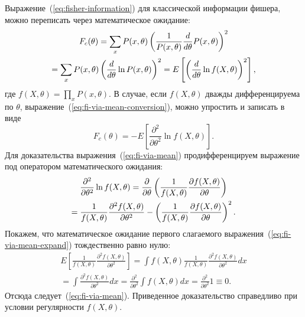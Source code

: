 Выражение~(\ref{eq:fisher-information}) для классической информации фишера, можно переписать через математическое ожидание:
\begin{multline}\label{eq:fi-via-mean-conversion}
    F_c(\theta)
    = \sum_x P(x, \theta)\left( \frac{1}{P(x,\theta)}\frac{d}{d \theta} P(x, \theta) \right)^2 \\
    = \sum_x P(x,\theta)\left( \frac{d}{d \theta} \ln P(x, \theta) \right)^2
    = E\left[\left( \frac{d}{d \theta}\ln f(X,\theta) \right)^2 \right],
\end{multline}
%
где $f(X,\theta) = \prod_x P(x, \theta)$.
В случае, если $f(X,\theta)$ дважды дифференцируема по $\theta$,
выражение~(\ref{eq:fi-via-mean-conversion}), можно упростить и записать в виде
%
\begin{equation}\label{eq:fi-via-mean}
  F_c(\theta) = -E \left[\frac{\partial^2}{\partial \theta^2} \ln f(X,\theta)\right].
\end{equation}
%
Для доказательства выражения~(\ref{eq:fi-via-mean})
продифференцируем выражение под оператором математического ожидания:
%
\begin{multline}\label{eq:fi-via-mean-expand}
  \frac{\partial^2}{\partial \theta^2}\ln f(X,\theta)
  = \frac{\partial}{\partial \theta}\left( \frac{1}{f(X,\theta)}
    \frac{\partial f(X,\theta)}{\partial \theta}  \right) \\
  = \frac{1}{f(X,\theta)}\frac{\partial^2 f(X,\theta)}{\partial \theta^2}
  - \left( \frac{1}{f(X,\theta)} \frac{\partial f(X,\theta)}{\partial \theta} \right)^2.
\end{multline}
%
Покажем,
что математическое ожидание первого слагаемого выражения~(\ref{eq:fi-via-mean-expand}) тождественно равно нулю:
%
\begin{multline}\label{eq:fi-via-mean-proof}
  E\left[\frac{1}{f(X,\theta)}
    \frac{\partial^2 f(X,\theta)}{\partial \theta^2}\right]
  = \int f (X,\theta) \frac{1}{f(X,\theta)}
    \frac{\partial^2 f(X, \theta)}{\partial \theta^2}dx \\
  = \int \frac{\partial^2 f(X,\theta)}{\partial \theta^2}dx
  = \frac{\partial^2}{\partial \theta^2} \int f(X,\theta)dx
  = \frac{\partial^2}{\partial \theta^2}1
  \equiv 0.
\end{multline}
%
Отсюда следует~(\ref{eq:fi-via-mean}).
Приведенное доказательство справедливо при условии регулярности $f(X,\theta)$.


